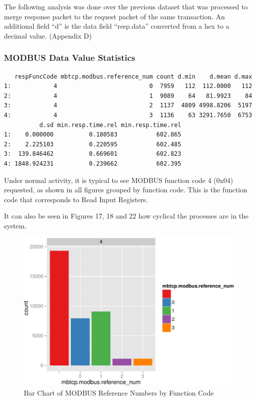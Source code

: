 \documentclass[11pt,]{article}
\begin{document}
The following analysis was done over the previous dataset that was
processed to merge response packet to the request packet of the same
transaction. An additional field ``d'' is the data field ``resp.data''
converted from a hex to a decimal value. (Appendix D)

\subsubsection{MODBUS Data Value
Statistics}\label{modbus-data-value-statistics}

\begin{verbatim}
   respFuncCode mbtcp.modbus.reference_num count d.min    d.mean d.max
1:            4                          0  7959   112  112.0000   112
2:            4                          1  9089    64   81.9923    84
3:            4                          2  1137  4809 4998.8206  5197
4:            4                          3  1136    63 3291.7650  6753
          d.sd min.resp.time.rel min.resp.time.rel
1:    0.000000          0.180583           602.865
2:    2.225103          0.220595           602.485
3:  139.846462          0.669601           602.823
4: 1848.924231          0.239662           602.395
\end{verbatim}

\clearpage

Under normal activity, it is typical to see MODBUS function code 4
(0x04) requested, as shown in all figures grouped by function code. This
is the function code that corresponds to Read Input Registers.

It can also be seen in Figures 17, 18 and 22 how cyclical the processes
are in the system.

\begin{figure}[h]

{\centering \includegraphics{thesis_files/figure-latex/unnamed-chunk-31-1} 

}

\caption{Bar Chart of MODBUS Reference Numbers by Function Code}\label{fig:unnamed-chunk-31}
\end{figure}
\end{document}
